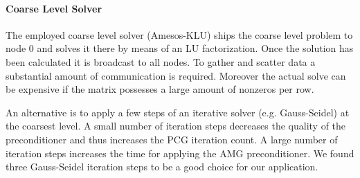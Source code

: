\paragraph{Coarse Level Solver} The employed coarse level solver
(Amesos-KLU) ships the coarse level problem to node $0$ and solves it
there by means of an LU factorization.  Once the solution has been
calculated it is broadcast to all nodes.  To gather and scatter data a
substantial amount of communication is required.  Moreover the actual
solve can be expensive if the matrix possesses a large amount of
nonzeros per row.

An alternative is to apply a few steps of an iterative solver (e.g.
Gauss-Seidel) at the coarsest level.  A small number of iteration steps
decreases the quality of the preconditioner and thus increases the PCG
iteration count.  A large number of iteration steps increases the time
for applying the AMG preconditioner.  We found three Gauss-Seidel
iteration steps to be a good choice for our application.


